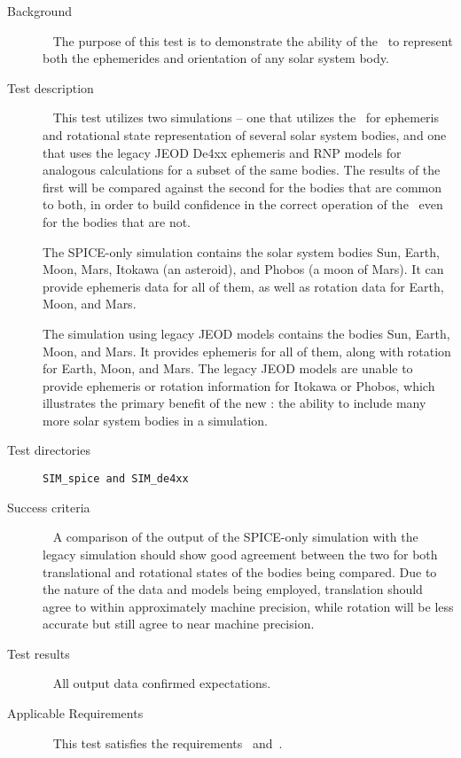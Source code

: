 \label{test:spice_ephem_rot}
\begin{description}

\item[Background]\ \newline
The purpose of this test is to demonstrate the ability of the \SpiceDesc\
to represent both the ephemerides and orientation of any solar system
body.


\item[Test description]\ \newline
This test utilizes two simulations -- one that utilizes the \SpiceDesc\
for ephemeris and rotational state representation of several
solar system bodies, and one that uses the legacy JEOD De4xx ephemeris and
RNP models for analogous calculations for a subset of the same bodies. The
results of the first will be compared against the second for the bodies that
are common to both, in order to build confidence in the correct operation of
the \SpiceDesc\ even for the bodies that are not. 

The SPICE-only simulation contains the solar system bodies Sun, Earth, Moon,
Mars, Itokawa (an asteroid), and Phobos (a moon of Mars). It can provide
ephemeris data for all of them, as well as rotation data for Earth, Moon,
and Mars.

The simulation using legacy JEOD models contains the bodies Sun, Earth,
Moon, and Mars. It provides ephemeris for all of them, along with rotation
for Earth, Moon, and Mars. The legacy JEOD models are unable to provide
ephemeris or rotation information for Itokawa or Phobos, which illustrates
the primary benefit of the new \SpiceDesc: the ability to include many
more solar system bodies in a simulation.


\item[Test directories] {\tt SIM\_spice and SIM\_de4xx}


\item[Success criteria]\ \newline
A comparison of the output of the SPICE-only simulation with the legacy
simulation should show good agreement between the two for both
translational and rotational states of the bodies being compared. Due
to the nature of the data and models being employed, translation
should agree to within approximately machine precision, while rotation
will be less accurate but still agree to near machine precision.


\item[Test results]\ \newline
All output data confirmed expectations.

\item[Applicable Requirements]\ \newline
This test satisfies the requirements~
and~\traceref{reqt:rep_rnp}.

\end{description}
